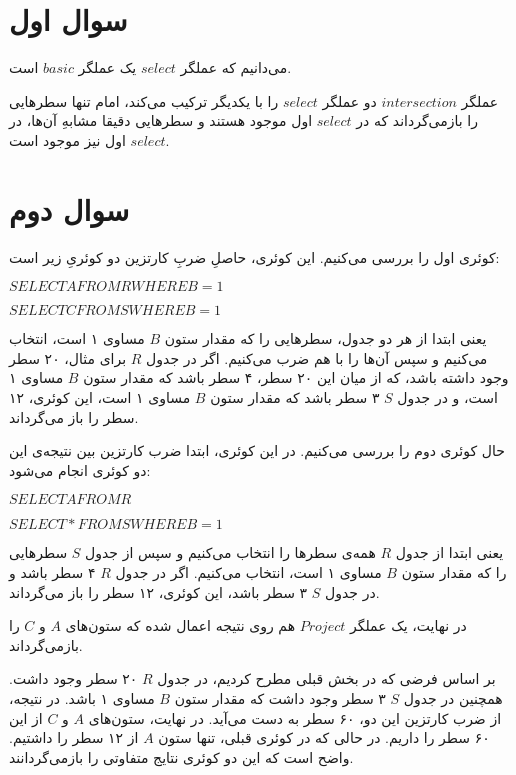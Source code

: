 
\section*{\centering سوال اول
}



می‌دانیم که عملگر
$select$
یک عملگر
$basic$
است.


عملگر
$intersection$
دو عملگر
$select$
را با یکدیگر ترکیب می‌کند، امام تنها سطرهایی را بازمی‌گرداند که در 
$select$
 اول موجود هستند و سطرهایی دقیقا مشابهِ آن‌ها، در
$select$
اول نیز موجود است.



\section*{\centering سوال دوم
}

کوئری اول را بررسی می‌کنیم.
این کوئری، حاصلِ ضربِ کارتزین دو کوئریِ زیر است:

$ SELECT   A   FROM   R   WHERE   B   =   1 $

$ SELECT C FROM S WHERE B = 1 $

یعنی ابتدا از هر دو جدول، سطرهایی را که مقدار ستون
$B$
مساوی ۱ است، انتخاب می‌کنیم و سپس آن‌ها را با هم ضرب می‌کنیم.
اگر در جدول
$R$
برای مثال، ۲۰ سطر وجود داشته باشد، که از میان این ۲۰ سطر، ۴ سطر باشد که مقدار ستون
$B$
مساوی ۱ است، و در جدول
$S$
۳ سطر باشد که مقدار ستون
$B$
مساوی ۱ است، این کوئری، ۱۲ سطر را باز می‌گرداند.

حال کوئری دوم را بررسی می‌کنیم.
در این کوئری، ابتدا ضرب کارتزین بین نتیجه‌ی این دو کوئری انجام می‌شود:

$ SELECT A FROM R$

$ SELECT * FROM S WHERE B = 1 $

یعنی ابتدا از جدول
$R$
همه‌ی سطرها را انتخاب می‌کنیم و سپس از جدول
$S$
سطرهایی را که مقدار ستون
$B$
مساوی ۱ است، انتخاب می‌کنیم.
اگر در جدول
$R$
۴ سطر باشد و در جدول
$S$
۳ سطر باشد، این کوئری، ۱۲ سطر را باز می‌گرداند.

در نهایت، یک  عملگر
$Project$
هم روی نتیجه اعمال شده که ستون‌های
$A$
و
$C$
را بازمی‌گرداند.

بر اساس فرضی که در بخش قبلی مطرح کردیم،‌ در جدول
$R$
۲۰ سطر وجود داشت.
همچنین در جدول
$S$
۳ سطر وجود داشت که مقدار ستون
$B$
مساوی ۱ باشد.
در نتیجه، از ضرب کارتزین این دو، ۶۰ سطر به دست می‌آید.
در نهایت، ستون‌های   
$A$
و
$C$
از این ۶۰ سطر را داریم.
در حالی که در کوئری قبلی، تنها ستون 
$A$
از ۱۲ سطر را داشتیم.
واضح است که این دو کوئری نتایج متفاوتی را بازمی‌گردانند.


